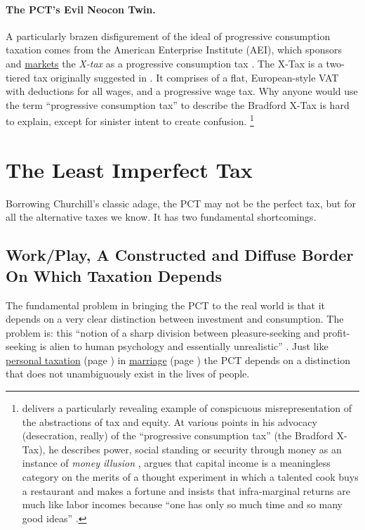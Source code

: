 \paragraph{The PCT's Evil Neocon Twin.}
A particularly brazen disfigurement of the ideal of progressive consumption taxation comes from the American Enterprise Institute (AEI), which sponsors and \hyperref[http://www.aei.org/outlook/29082]{markets} the \emph{\citeauthor{Bradford} X-tax} as a progressive consumption tax \citep{Bradford}.
The \citeauthor{Bradford1986} X-Tax is a two-tiered tax originally suggested in \citeyear{Bradford1986}.
It comprises of a flat, European-style VAT with deductions for all wages, and a progressive wage tax.
Why anyone would use the term ``progressive consumption tax'' to describe the Bradford X-Tax is hard to explain, except for sinister intent to create confusion.
\footnote{
	\cite{Shaviro2004} delivers a particularly revealing example of conspicuous misrepresentation of the abstractions of tax and equity.
	At various points in his advocacy (desecration, really) of the ``progressive consumption tax'' (the Bradford X-Tax), he describes power, social standing or security through money as an instance of \emph{money illusion} \citeyearpar[106]{Shaviro2004}, argues that capital income is a meaningless category on the merits of a thought experiment in which a talented cook buys a restaurant and makes a fortune \citeyearpar[100]{Shaviro2004} and insists that infra-marginal returns are much like labor incomes because ``one has only so much time and so many good ideas'' \citeyearpar[103]{Shaviro2004}.}

\section{The Least Imperfect Tax}
	\label{sec:LeastImperfect}
Borrowing Churchill's classic adage, the PCT may not be the perfect tax, but for all the alternative taxes we know.
It has two fundamental shortcomings.

\subsection[Work/Play]{Work/Play, A Constructed and Diffuse Border On Which Taxation Depends}
	\label{sec:WorkPlay}
The fundamental problem in bringing the PCT to the real world is that it depends on a very clear distinction between investment and consumption.
The problem is:
this ``notion of a sharp division between pleasure-seeking and profit-seeking is alien to human psychology and essentially unrealistic'' \citep[203]{Bittker1973}.
Just like \hyperref[des:PersonalTaxation]{personal taxation} (page \pageref{des:PersonalTaxation}) in \hyperref[sec:LoveMarriage]{marriage} (page \pageref{sec:LoveMarriage}) the PCT depends on a distinction that does not unambiguously exist in the lives of people.

